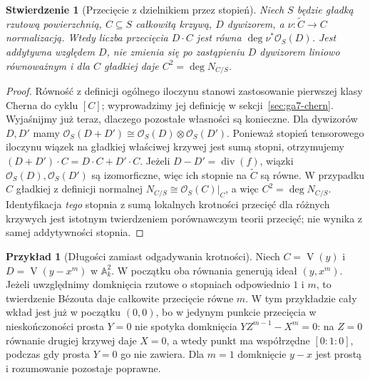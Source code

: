 \documentclass[11pt,a4paper,openany]{report}
\numberwithin{equation}{section}
\theoremstyle{plain}
\newtheorem{stwierdzenie}[twierdzenie]{Stwierdzenie}
\theoremstyle{definition}
\newtheorem{przyklad}[twierdzenie]{Przykład}
\theoremstyle{remark}
\newcommand{\A}{\mathbb A}
\newcommand{\V}{\operatorname V}
\begin{document}
\begin{stwierdzenie}[Przecięcie z dzielnikiem przez stopień]
\label{st:ga7-divisor-degree}
Niech $S$ będzie gładką rzutową powierzchnią,
$C\subseteq S$ całkowitą krzywą, $D$ dywizorem,
a $\nu:\widetilde C\to C$ normalizacją.
Wtedy liczba przecięcia $D\cdot C$ jest równa
$\deg\nu^*\mathcal O_S(D)$.
Jest addytywna względem $D$, nie zmienia się po
zastąpieniu $D$ dywizorem liniowo równoważnym i
dla $C$ gładkiej daje $C^2=\deg N_{C/S}$.
\end{stwierdzenie}
\begin{proof}
Równość z definicji ogólnego iloczynu stanowi
zastosowanie pierwszej klasy Cherna do cyklu $[C]$;
wyprowadzimy jej definicję w sekcji~\ref{sec:ga7-chern}.
Wyjaśnijmy już teraz, dlaczego pozostałe własności są
konieczne. Dla dywizorów $D,D'$ mamy
$\mathcal O_S(D+D')\cong\mathcal O_S(D)\otimes\mathcal O_S(D')$.
Ponieważ stopień tensorowego iloczynu wiązek na gładkiej
właściwej krzywej jest sumą stopni, otrzymujemy
$(D+D')\cdot C=D\cdot C+D'\cdot C$.
Jeżeli $D-D'=\operatorname{div}(f)$, wiązki
$\mathcal O_S(D),\mathcal O_S(D')$ są izomorficzne,
więc ich stopnie na $\widetilde C$ są równe.
W przypadku $C$ gładkiej z definicji normalnej
$N_{C/S}\cong\mathcal O_S(C)|_C$,
a więc $C^2=\deg N_{C/S}$.
Identyfikacja \emph{tego} stopnia z sumą lokalnych
krotności przecięć dla różnych krzywych jest
istotnym twierdzeniem porównawczym teorii przecięć;
nie wynika z samej addytywności stopnia.
\end{proof}

\begin{przyklad}[Długości zamiast odgadywania krotności]
Niech $C=\V(y)$ i $D=\V(y-x^m)$ w $\A^2_k$.
W początku oba równania generują ideał $(y,x^m)$.
Jeżeli uwzględnimy domknięcia rzutowe o stopniach
odpowiednio $1$ i $m$, to twierdzenie Bézouta daje
całkowite przecięcie równe $m$. W tym przykładzie
cały wkład jest już w początku $(0,0)$, bo w jedynym
punkcie przecięcia w nieskończoności prosta $Y=0$
nie spotyka domknięcia $YZ^{m-1}-X^m=0$:
na $Z=0$ równanie drugiej krzywej daje $X=0$, a wtedy
punkt ma współrzędne $[0:1:0]$, podczas gdy
prosta $Y=0$ go nie zawiera. Dla $m=1$ domknięcie
$y-x$ jest prostą i rozumowanie pozostaje poprawne.
\end{przyklad}
\end{document}
